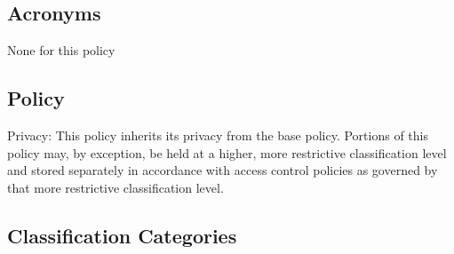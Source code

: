 \documentclass[../main.tex]{subfiles}
\begin{document}
\subsection{Acronyms}
None for this policy
\subsection{Policy}
Privacy: This policy inherits its privacy from the base policy. Portions of this policy may, by exception, be held at a higher, more restrictive classification level and stored separately
in accordance with access control policies as governed by that more restrictive classification level.
\subsection{Classification Categories}
\end{document}
